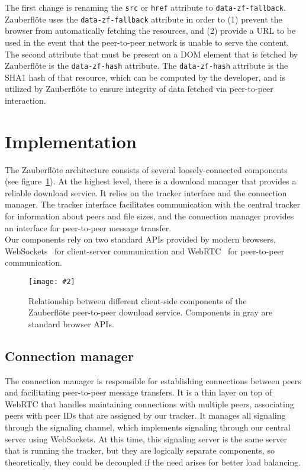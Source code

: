 \documentclass[letterpaper,twocolumn,10pt]{article}
\newcommand{\zbf}{Zauberfl\"{o}te\xspace}
\newcommand{\inclfigure}[3]{
    \begin{figure}
        \begin{centering}
            \texttt{[image: \#2]}
            \caption{#3}
            \label{#1}
        \end{centering}
    \end{figure}
}
\begin{document}
The first change is renaming the \texttt{src} or \texttt{href} attribute to
\texttt{data-zf-fallback}. \zbf uses the \texttt{data-zf-fallback} attribute
in order to (1) prevent the browser from automatically fetching the resources,
and (2) provide a URL to be used in the event that the peer-to-peer network
is unable to serve the content. \\

The second attribute that must be present on a DOM element that is fetched by
\zbf is the \texttt{data-zf-hash} attribute. The \texttt{data-zf-hash} attribute
is the SHA1 hash of that resource, which can be computed by the developer, and
is utilized by \zbf to ensure integrity of data fetched via peer-to-peer interaction.

\section{Implementation}

The \zbf architecture consists of several loosely-connected components (see
figure~\ref{fig:components}). At the highest level, there is a download manager that
provides a reliable download service. It relies on the tracker interface and
the connection manager. The tracker interface facilitates communication with
the central tracker for information about peers and file sizes, and the
connection manager provides an interface for peer-to-peer message transfer. \\

Our components rely on two standard APIs provided by modern browsers,
WebSockets~\cite{w3c:websocket} for client-server communication and
WebRTC~\cite{w3c:webrtc} for peer-to-peer communication.

\inclfigure{fig:components}{components.pdf}{
    Relationship between different client-side components of the \zbf
    peer-to-peer download service. Components in gray are standard browser
    APIs.
}

\subsection{Connection manager}

The connection manager is responsible for establishing connections between
peers and facilitating peer-to-peer message transfers. It is a thin layer on
top of WebRTC that handles maintaining connections with multiple peers,
associating peers with peer IDs that are assigned by our tracker. It manages
all signaling through the signaling channel, which implements signaling through
our central server using WebSockets. At this time, this signaling server is the
same server that is running the tracker, but they are logically separate
components, so theoretically, they could be decoupled if the need arises for better load
balancing.
\end{document}

